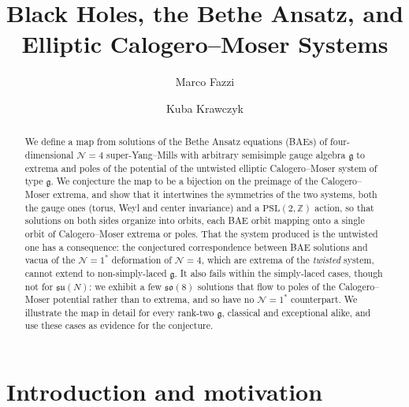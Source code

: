 \documentclass[aps, prx, nofootinbib, twocolumn,amsfonts,amsmath,amssymb,mathtools,superscriptaddress,preprintnumbers,floatfix,reprint]{revtex4-2}
\newcommand{\alg}{\mathfrak{g}}
\begin{document}
\title{Black Holes, the Bethe Ansatz, and Elliptic Calogero--Moser Systems}
\author{Marco Fazzi}
\author{Kuba Krawczyk}

\begin{abstract}
We define a map from solutions of the Bethe Ansatz equations (BAEs) of
four-dimensional $\mathcal{N}=4$ super-Yang--Mills with arbitrary semisimple
gauge algebra $\alg$ to extrema and poles of the potential of the untwisted
elliptic Calogero--Moser system of type $\alg$. We conjecture the map to be a
bijection on the preimage of the Calogero--Moser extrema, and show that it
intertwines the symmetries of the two systems, both the gauge ones (torus, Weyl
and center invariance) and a $\mathrm{PSL}(2,\mathbb{Z})$ action, so that
solutions on both sides organize into orbits, each BAE orbit mapping onto a
single orbit of Calogero--Moser extrema or poles. That the system produced is
the untwisted one has a consequence: the conjectured correspondence between BAE
solutions and vacua of the $\mathcal{N}=1^\ast$ deformation of $\mathcal{N}=4$, which are extrema of the \emph{twisted} system, cannot
extend to non-simply-laced $\alg$. It also fails within the simply-laced cases, though not for $\mathfrak{su}(N)$: we exhibit a few $\mathfrak{so}(8)$ solutions that flow to poles of
the Calogero--Moser potential rather than to extrema, and so have no
$\mathcal{N}=1^\ast$ counterpart. We illustrate the map in detail for every
rank-two $\alg$, classical and exceptional alike, and use these cases as
evidence for the conjecture.

\end{abstract}

\maketitle

\section{Introduction and motivation}
\label{sec:intro}
\end{document}
